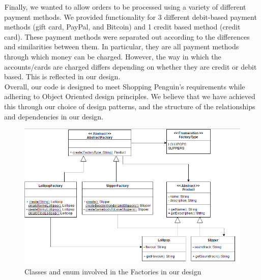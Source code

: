 \documentclass[letter paper, 12pt]{article}
\newcommand{\tab}{${}_{}$\hspace{0.2in}}
\begin{document}
\tab Finally, we wanted to allow orders to be processed using a variety of different payment methods. We provided functionality for 3 different debit-based payment methods (gift card, PayPal, and Bitcoin) and 1 credit based method (credit card). These payment methods were separated out according to the differences and similarities between them. In particular, they are all payment methods through which money can be charged. However, the way in which the accounts/cards are charged differs depending on whether they are credit or debit based. This is reflected in our design.\\
\tab Overall, our code is designed to meet Shopping Penguin's requirements while adhering to Object Oriented design principles. We believe that we have achieved this through our choice of design patterns, and the structure of the relationships and dependencies in our design.
\vspace{1in}

\begin{figure}[h]
	\caption{Classes and enum involved in the Factories in our design}
	\includegraphics[scale=0.9]{FactoryUML}
\end{figure}
\newpage
\end{document}
